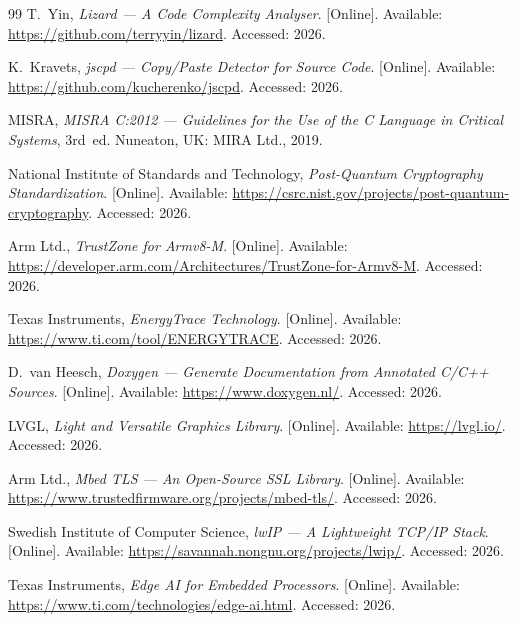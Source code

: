 \documentclass[12pt,a4paper,oneside]{book}
\begin{document}
\begin{thebibliography}{99}
T.~Yin, \emph{Lizard --- A Code Complexity Analyser}. [Online]. Available: \url{https://github.com/terryyin/lizard}. Accessed: 2026.

K.~Kravets, \emph{jscpd --- Copy/Paste Detector for Source Code}. [Online]. Available: \url{https://github.com/kucherenko/jscpd}. Accessed: 2026.

MISRA, \emph{MISRA C:2012 --- Guidelines for the Use of the C Language in Critical Systems}, 3rd~ed. Nuneaton, UK: MIRA Ltd., 2019.

National Institute of Standards and Technology, \emph{Post-Quantum Cryptography Standardization}. [Online]. Available: \url{https://csrc.nist.gov/projects/post-quantum-cryptography}. Accessed: 2026.

Arm Ltd., \emph{TrustZone for Armv8-M}. [Online]. Available: \url{https://developer.arm.com/Architectures/TrustZone-for-Armv8-M}. Accessed: 2026.

Texas Instruments, \emph{EnergyTrace Technology}. [Online]. Available: \url{https://www.ti.com/tool/ENERGYTRACE}. Accessed: 2026.

D.~van Heesch, \emph{Doxygen --- Generate Documentation from Annotated C/C++ Sources}. [Online]. Available: \url{https://www.doxygen.nl/}. Accessed: 2026.

LVGL, \emph{Light and Versatile Graphics Library}. [Online]. Available: \url{https://lvgl.io/}. Accessed: 2026.

Arm Ltd., \emph{Mbed TLS --- An Open-Source SSL Library}. [Online]. Available: \url{https://www.trustedfirmware.org/projects/mbed-tls/}. Accessed: 2026.

Swedish Institute of Computer Science, \emph{lwIP --- A Lightweight TCP/IP Stack}. [Online]. Available: \url{https://savannah.nongnu.org/projects/lwip/}. Accessed: 2026.

Texas Instruments, \emph{Edge AI for Embedded Processors}. [Online]. Available: \url{https://www.ti.com/technologies/edge-ai.html}. Accessed: 2026.

\end{thebibliography}
\end{document}
